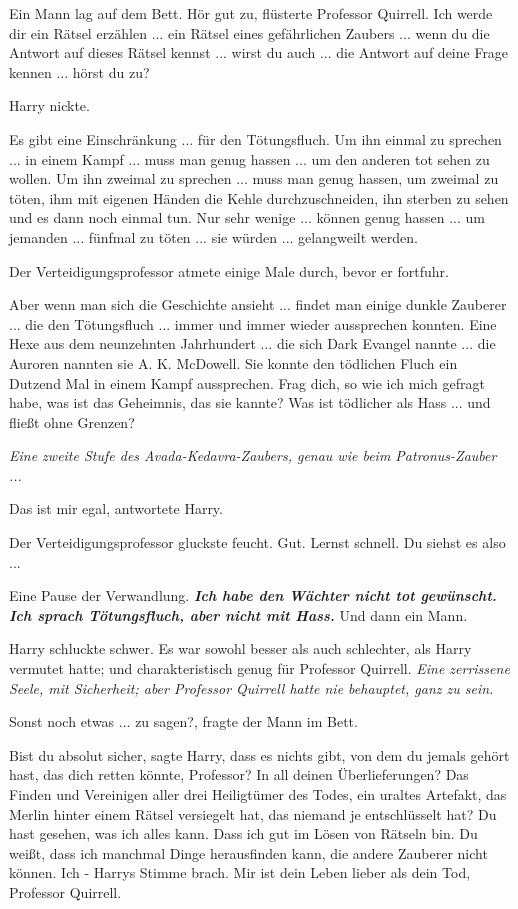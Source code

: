 Ein Mann lag auf dem Bett. \glqq{}Hör gut zu\grqq{}, flüsterte Professor
Quirrell. \glqq{}Ich werde dir ein Rätsel erzählen ... ein Rätsel eines
gefährlichen Zaubers ... wenn du die Antwort auf dieses Rätsel kennst ... wirst
du auch ... die Antwort auf deine Frage kennen ... hörst du zu?\grqq{}

Harry nickte.

\glqq{}Es gibt eine Einschränkung ... für den Tötungsfluch. Um ihn einmal zu
sprechen ... in einem Kampf ... muss man genug hassen ... um den anderen tot sehen
zu wollen. Um ihn zweimal zu sprechen ... muss man genug hassen, um zweimal zu
töten, ihm mit eigenen Händen die Kehle durchzuschneiden, ihn sterben zu sehen
und es dann noch einmal tun. Nur sehr wenige ... können genug hassen ... um
jemanden ... fünfmal zu töten ... sie würden ... gelangweilt werden.\grqq{}

Der Verteidigungsprofessor atmete einige Male durch, bevor er fortfuhr.

\glqq{}Aber wenn man sich die Geschichte ansieht ... findet man einige dunkle
Zauberer ... die den Tötungsfluch ... immer und immer wieder aussprechen konnten.
Eine Hexe aus dem neunzehnten Jahrhundert ... die sich Dark Evangel nannte ... die
Auroren nannten sie A. K. McDowell. Sie konnte den tödlichen Fluch ein Dutzend
Mal in einem Kampf aussprechen. Frag dich, so wie ich mich gefragt habe, was ist
das Geheimnis, das sie kannte? Was ist tödlicher als Hass ... und fließt ohne
Grenzen?\grqq{}

\emph{Eine zweite Stufe des Avada-Kedavra-Zaubers, genau wie beim
Patronus-Zauber ...}

\glqq{}Das ist mir egal\grqq{}, antwortete Harry.

Der Verteidigungsprofessor gluckste feucht. \glqq{}Gut. Lernst schnell. Du siehst
es also ...\grqq{}

Eine Pause der Verwandlung. \glqq{}\textbf{\emph{Ich habe den Wächter nicht tot
gewünscht. Ich sprach Tötungsfluch, aber nicht mit Hass.}}\grqq{} Und dann ein Mann.

Harry schluckte schwer. Es war sowohl besser als auch schlechter, als Harry
vermutet hatte; und charakteristisch genug für Professor Quirrell. \emph{Eine
zerrissene Seele, mit Sicherheit; aber Professor Quirrell hatte nie behauptet,
ganz zu sein.}

\glqq{}Sonst noch etwas ... zu sagen?\grqq{}, fragte der Mann im Bett.

\glqq{}Bist du absolut sicher\grqq{}, sagte Harry, \glqq{}dass es nichts gibt, von
dem du jemals gehört hast, das dich retten könnte, Professor? In all deinen
Überlieferungen? Das Finden und Vereinigen aller drei Heiligtümer des Todes, ein
uraltes Artefakt, das Merlin hinter einem Rätsel versiegelt hat, das niemand je
entschlüsselt hat? Du hast gesehen, was ich alles kann. Dass ich gut im Lösen
von Rätseln bin. Du weißt, dass ich manchmal Dinge herausfinden kann, die andere
Zauberer nicht können. Ich -\grqq{} Harrys Stimme brach. \glqq{}Mir ist dein Leben
lieber als dein Tod, Professor Quirrell.\grqq{}

